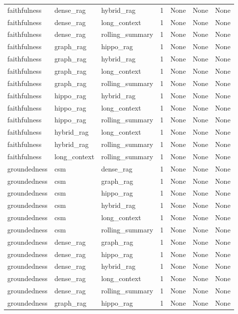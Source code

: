 \begin{tabular}{lllllll}
faithfulness & dense\_rag & hybrid\_rag & 1 & None & None & None \\
faithfulness & dense\_rag & long\_context & 1 & None & None & None \\
faithfulness & dense\_rag & rolling\_summary & 1 & None & None & None \\
faithfulness & graph\_rag & hippo\_rag & 1 & None & None & None \\
faithfulness & graph\_rag & hybrid\_rag & 1 & None & None & None \\
faithfulness & graph\_rag & long\_context & 1 & None & None & None \\
faithfulness & graph\_rag & rolling\_summary & 1 & None & None & None \\
faithfulness & hippo\_rag & hybrid\_rag & 1 & None & None & None \\
faithfulness & hippo\_rag & long\_context & 1 & None & None & None \\
faithfulness & hippo\_rag & rolling\_summary & 1 & None & None & None \\
faithfulness & hybrid\_rag & long\_context & 1 & None & None & None \\
faithfulness & hybrid\_rag & rolling\_summary & 1 & None & None & None \\
faithfulness & long\_context & rolling\_summary & 1 & None & None & None \\
groundedness & csm & dense\_rag & 1 & None & None & None \\
groundedness & csm & graph\_rag & 1 & None & None & None \\
groundedness & csm & hippo\_rag & 1 & None & None & None \\
groundedness & csm & hybrid\_rag & 1 & None & None & None \\
groundedness & csm & long\_context & 1 & None & None & None \\
groundedness & csm & rolling\_summary & 1 & None & None & None \\
groundedness & dense\_rag & graph\_rag & 1 & None & None & None \\
groundedness & dense\_rag & hippo\_rag & 1 & None & None & None \\
groundedness & dense\_rag & hybrid\_rag & 1 & None & None & None \\
groundedness & dense\_rag & long\_context & 1 & None & None & None \\
groundedness & dense\_rag & rolling\_summary & 1 & None & None & None \\
groundedness & graph\_rag & hippo\_rag & 1 & None & None & None \\

\end{tabular}
